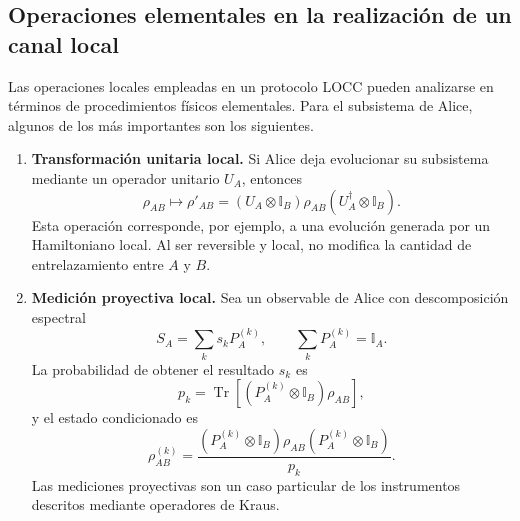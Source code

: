 \documentclass[12pt,a4paper]{article}
\theoremstyle{definition}
\theoremstyle{plain}
\theoremstyle{remark}
\newcommand{\I}{\mathbb{I}}
\newcommand{\TrA}{\operatorname{Tr}}
\begin{document}
\subsection{Operaciones elementales en la realización de un canal local}

Las operaciones locales empleadas en un protocolo LOCC pueden analizarse en términos de procedimientos físicos elementales. Para el subsistema de Alice, algunos de los más importantes son los siguientes.

\begin{enumerate}
    \item \textbf{Transformación unitaria local.} Si Alice deja evolucionar su subsistema mediante un operador unitario $U_A$, entonces
    \begin{equation*}
        \rho_{AB}
        \longmapsto
        \rho'_{AB}
        =\left(U_A\otimes\I_B\right)
        \rho_{AB}
        \left(U_A^{\dagger}\otimes\I_B\right).
    \end{equation*}
    Esta operación corresponde, por ejemplo, a una evolución generada por un Hamiltoniano local. Al ser reversible y local, no modifica la cantidad de entrelazamiento entre $A$ y $B$.

    \item \textbf{Medición proyectiva local.} Sea un observable de Alice con descomposición espectral
    \begin{equation*}
        S_A=\sum_k s_k P_A^{(k)},
        \qquad
        \sum_k P_A^{(k)}=\I_A.
    \end{equation*}
    La probabilidad de obtener el resultado $s_k$ es
    \begin{equation*}
        p_k
        =\TrA\!\left[
            \left(P_A^{(k)}\otimes\I_B\right)
            \rho_{AB}
        \right],
    \end{equation*}
    y el estado condicionado es
    \begin{equation*}
        \rho_{AB}^{(k)}
        =\frac{
            \left(P_A^{(k)}\otimes\I_B\right)
            \rho_{AB}
            \left(P_A^{(k)}\otimes\I_B\right)
        }{p_k}.
    \end{equation*}
    Las mediciones proyectivas son un caso particular de los instrumentos descritos mediante operadores de Kraus.


\end{enumerate}
\end{document}
